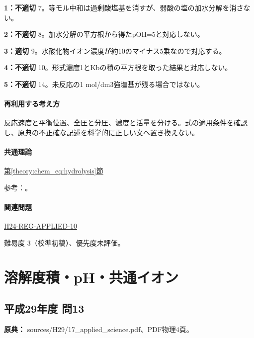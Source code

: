 \noindent\textbf{1：不適切} 7。等モル中和は過剰酸塩基を消すが、弱酸の塩の加水分解を消さない。\par

\noindent\textbf{2：不適切} 8。加水分解の平方根から得たpOH=\allowbreak{}5と対応しない。\par

\noindent\textbf{3：適切} 9。水酸化物イオン濃度が約10のマイナス5乗なので対応する。\par

\noindent\textbf{4：不適切} 10。形式濃度1とKbの積の平方根を取った結果と対応しない。\par

\noindent\textbf{5：不適切} 14。未反応の1 mol/dm3強塩基が残る場合ではない。\par

\paragraph{再利用する考え方} 反応速度と平衡位置、全圧と分圧、濃度と活量を分ける。式の適用条件を確認し、原典の不正確な記述を科学的に正しい文へ置き換えない。

\paragraph{共通理論} \hyperref[theory:chem_eq:hydrolysis]{第\ref*{theory:chem_eq:hydrolysis}節}

\par 参考：\cite{iupac_greenbook2012,mit_buffer2008}。

\paragraph{関連問題} \hyperref[q:h24-reg-applied-10]{H24-REG-APPLIED-10}

\par 難易度 3（校準初稿）、優先度未評価。

\section{溶解度積・pH・共通イオン}

\subsection{平成29年度 問13}
\label{q:h29-reg-applied-13}

\noindent\textbf{原典：} sources/H29/17\_applied\_science.pdf、PDF物理4頁。


